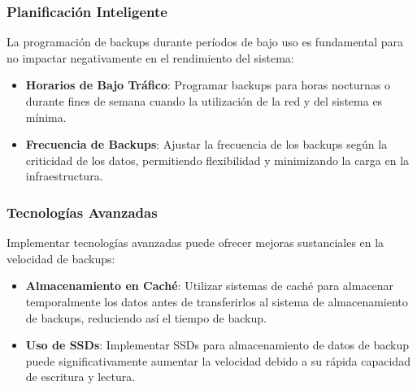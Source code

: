 \subsubsection{Planificación Inteligente }

La programación de backups durante períodos de bajo uso es fundamental para no impactar negativamente en el rendimiento del sistema:

\begin{itemize}
    \item \textbf{Horarios de Bajo Tráfico}: Programar backups para horas nocturnas o durante fines de semana cuando la utilización de la red y del sistema es mínima.
    \item \textbf{Frecuencia de Backups}: Ajustar la frecuencia de los backups según la criticidad de los datos, permitiendo flexibilidad y minimizando la carga en la infraestructura.
\end{itemize}

\subsubsection{Tecnologías Avanzadas}

Implementar tecnologías avanzadas puede ofrecer mejoras sustanciales en la velocidad de backups:

\begin{itemize}
    \item \textbf{Almacenamiento en Caché}: Utilizar sistemas de caché para almacenar temporalmente los datos antes de transferirlos al sistema de almacenamiento de backups, reduciendo así el tiempo de backup.
    \item \textbf{Uso de SSDs}: Implementar SSDs para almacenamiento de datos de backup puede significativamente aumentar la velocidad debido a su rápida capacidad de escritura y lectura.
\end{itemize}


